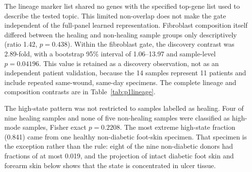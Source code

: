 \documentclass[10pt,a4paper]{article}
\begin{document}
The lineage marker list shared no genes with the specified top-gene list used to describe the tested topic. This limited non-overlap does not make the gate independent of the full-panel learned representation. Fibroblast composition itself differed between the healing and non-healing sample groups only descriptively (ratio 1.42, $p=0.438$). Within the fibroblast gate, the discovery contrast was 2.89-fold, with a bootstrap 95\% interval of 1.06--13.97 and sample-level $p=0.04196$. This value is retained as a discovery observation, not as an independent patient validation, because the 14 samples represent 11 patients and include repeated same-wound, same-day specimens. The complete lineage and composition contrasts are in Table~\ref{tab:p1lineage}.

The high-state pattern was not restricted to samples labelled as healing. Four of nine healing samples and none of five non-healing samples were classified as high-mode samples, Fisher exact $p=0.2208$. The most extreme high-state fraction (0.841) came from one healthy non-diabetic foot-skin specimen. That specimen is the exception rather than the rule: eight of the nine non-diabetic donors had fractions of at most 0.019, and the projection of intact diabetic foot skin and forearm skin below shows that the state is concentrated in ulcer tissue.
\end{document}
